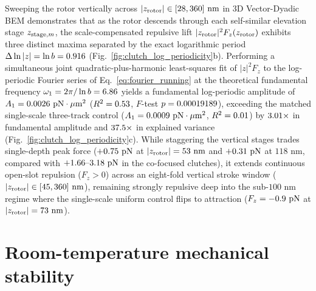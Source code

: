 \documentclass[pdflatex,sn-nature]{sn-jnl}
\DeclareRobustCommand{\roundone}[1]{\fpeval{round(#1,1)}}
\DeclareRobustCommand{\roundtwo}[1]{\fpeval{round(#1,2)}}
\DeclareRobustCommand{\roundthree}[1]{\fpeval{round(#1,3)}}
\DeclareRobustCommand{\roundfour}[1]{\fpeval{round(#1,4)}}
\begin{document}
Sweeping the rotor vertically across $|z_{\rm rotor}| \in [28, 360]\text{ nm}$ in 3D Vector-Dyadic BEM demonstrates that as the rotor descends through each self-similar elevation stage $z_{{\rm stage},m}$, the scale-compensated repulsive lift $|z_{\rm rotor}|^2 F_z(z_{\rm rotor})$ exhibits three distinct maxima separated by the exact logarithmic period $\Delta\ln|z| = \ln b = \roundthree{\LogperSteppedRzLnB}$ (Fig.~\ref{fig:clutch_log_periodicity}b). Performing a simultaneous joint quadratic-plus-harmonic least-squares fit of $|z|^2 F_z$ to the log-periodic Fourier series of Eq.~\eqref{eq:fourier_running} at the theoretical fundamental frequency $\omega_1 = 2\pi/\ln b = \roundtwo{\LogperSteppedRzOmegaone}$ yields a fundamental log-periodic amplitude of $A_1 = \roundfour{\LogperSteppedRzAmponeCantor}\text{ pN}\cdot\mu\text{m}^2$ ($R^2 = \roundtwo{\LogperSteppedRzRtwo}$\ifdefined\LogperSteppedRzPvalCantor, $F$-test $p = 0.00019189{}$\fi), exceeding the matched single-scale three-track control ($A_1 = \roundfour{\LogperSteppedRzAmponeUniform}\text{ pN}\cdot\mu\text{m}^2$, $R^2 = \roundtwo{\LogperSteppedRzRtwoUniform}$) by $\roundtwo{\LogperSteppedRzAmponeRatio}\times$ in fundamental amplitude and $\roundone{\LogperSteppedRzRtwoRatio}\times$ in explained variance (Fig.~\ref{fig:clutch_log_periodicity}c). While staggering the vertical stages trades single-depth peak force ($+\roundtwo{\LogperSteppedRzMaxFzCantorPn}\text{ pN}$ at $|z_{\rm rotor}| = 53\text{ nm}$ and $+\roundtwo{\LogperSteppedRzStagetwoFzCantorPn}\text{ pN}$ at $118\text{ nm}$, compared with $+\roundtwo{\CantorNtwoHybridrzBemStdFZPn}\text{--}\roundtwo{\FractalNthreeCantorseventrackBemThetathreeFZPn}\text{ pN}$ in the co-focused clutches), it extends continuous open-slot repulsion ($F_z > 0$) across an eight-fold vertical stroke window ($|z_{\rm rotor}| \in [45, 360]\text{ nm}$), remaining strongly repulsive deep into the sub-$100\text{ nm}$ regime where the single-scale uniform control flips to attraction ($F_z = \roundtwo{\LogperSteppedRzMinFzUniformPn}\text{ pN}$ at $|z_{\rm rotor}| = 73\text{ nm}$).

\section*{Room-temperature mechanical stability}
\label{sec:experimental}
\end{document}
